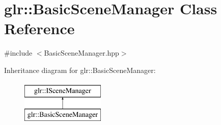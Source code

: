 \hypertarget{classglr_1_1BasicSceneManager}{\section{glr\-:\-:Basic\-Scene\-Manager Class Reference}
\label{classglr_1_1BasicSceneManager}
}


{\ttfamily \#include $<$Basic\-Scene\-Manager.\-hpp$>$}

Inheritance diagram for glr\-:\-:Basic\-Scene\-Manager\-:\begin{figure}[H]
\begin{center}
\leavevmode
\includegraphics[height=2.000000cm]{classglr_1_1BasicSceneManager}
\end{center}
\end{figure}
